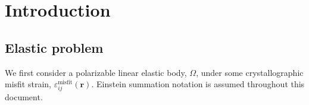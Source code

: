 \documentclass[16pt]{article} %
\begin{document}

\tableofcontents %

\newpage %


\section{Introduction}

\subsection{Elastic problem}

%
We first consider a polarizable linear elastic body, $\Omega$, under some crystallographic misfit strain, $\varepsilon_{ij}^\mathrm{misfit} (\textbf{r})$.
%
Einstein summation notation is assumed throughout this document.
\end{document}
